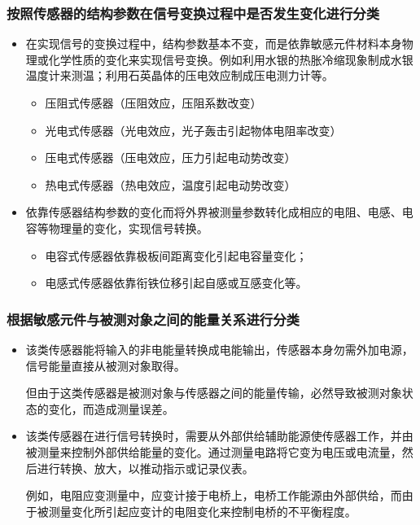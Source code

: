 \begin{frame}
    \frametitle{按照传感器的结构参数在信号变换过程中是否发生变化进行分类}
    \begin{itemize}
        \item {}
        
        在实现信号的变换过程中，结构参数基本不变，而是依靠敏感元件材料本身物理或化学性质的变化来实现信号变换。例如利用水银的热胀冷缩现象制成水银温度计来测温；利用石英晶体的压电效应制成压电测力计等。

        \begin{itemize}
            \item 压阻式传感器（压阻效应，压阻系数改变）
            \item 光电式传感器（光电效应，光子轰击引起物体电阻率改变）
            \item 压电式传感器（压电效应，压力引起电动势改变）
            \item 热电式传感器（热电效应，温度引起电动势改变）
        \end{itemize}
        \item {}
        
        依靠传感器结构参数的变化而将外界被测量参数转化成相应的电阻、电感、电容等物理量的变化，实现信号转换。
        \begin{itemize}
            \item 电容式传感器依靠极板间距离变化引起电容量变化；
            \item 电感式传感器依靠衔铁位移引起自感或互感变化等。
        \end{itemize}
        
    \end{itemize}
\end{frame}

\begin{frame}
    \frametitle{根据敏感元件与被测对象之间的能量关系进行分类}
    \begin{itemize}
        \item {}
        
        该类传感器能将输入的非电能量转换成电能输出，传感器本身勿需外加电源，信号能量直接从被测对象取得。
        
        但由于这类传感器是被测对象与传感器之间的能量传输，必然导致被测对象状态的变化，而造成测量误差。

        \item {}
        
        该类传感器在进行信号转换时，需要从外部供给辅助能源使传感器工作，并由被测量来控制外部供给能量的变化。通过测量电路将它变为电压或电流量，然后进行转换、放大，以推动指示或记录仪表。

        例如，电阻应变测量中，应变计接于电桥上，电桥工作能源由外部供给，而由于被测量变化所引起应变计的电阻变化来控制电桥的不平衡程度。
    \end{itemize}
\end{frame}


